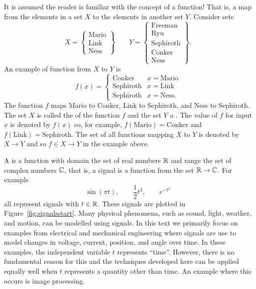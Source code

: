 

It is assumed the reader is familiar with the concept of a function!  That is, a map from the elements in a set $X$ to the elements in another set $Y$.  Consider sets
\[
X = \left\{
\begin{array}{c}
\text{Mario} \\
\text{Link} \\
\text{Ness} 
\end{array} 
\right\}
 \qquad 
Y = \left\{
\begin{array}{c}
\text{Freeman} \\
\text{Ryu} \\
\text{Sephiroth} \\
\text{Conker} \\
\text{Ness}
\end{array} 
\right\}.
\]
An example of function from $X$ to $Y$ is
\[
f(x) = \begin{cases}
\text{Conker} & x = \text{Mario} \\
\text{Sephiroth} & x = \text{Link} \\
\text{Sephiroth} & x = \text{Ness}.
\end{cases}
\]
The function $f$ maps Mario to Conker, Link to Sephiroth, and Ness to Sephiroth.  The set $X$ is called the  of the function $f$ and the set $Y$ a .  The value of $f$ for input $x$ is denoted by $f(x)$ so, for example, $f(\text{Mario}) = \text{Conker}$ and $f(\text{Link}) = \text{Sephiroth}$.  The set of all functions mapping $X$ to $Y$ is denoted by $X \to Y$ and so $f \in X \to Y$ in the example above.

A  is a function with domain the set of real numbers ${\mathbb R}$ and range the set of complex numbers ${\mathbb C}$, that is, a signal is a function from the set ${\mathbb R} \to {\mathbb C}$.  For example
\[
\sin( \pi t), \qquad \frac{1}{2} t^3, \qquad e^{-t^2}
\]   
all represent signals with $t \in {\mathbb R}$.  These signals are plotted in Figure~\ref{fig:signalsstart}.  Many physical phenomena, such as sound, light, weather, and motion, can be modelled using signals.  In this text we primarily focus on examples from electrical and mechanical engineering where signals are use to model changes in voltage, current, position, and angle over time.  In these examples, the independent variable $t$ represents ``time''.  However, there is no fundamental reason for this and the techniques developed here can be applied equally well when $t$ represents a quantity other than time.  An example where this occurs is image processing.

